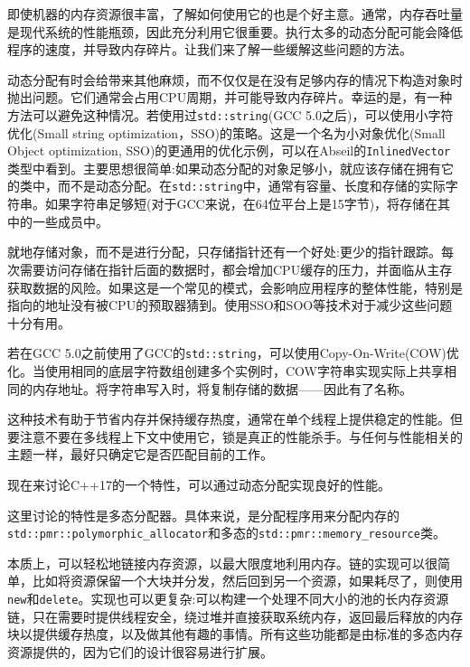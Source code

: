 

即使机器的内存资源很丰富，了解如何使用它的也是个好主意。通常，内存吞吐量是现代系统的性能瓶颈，因此充分利用它很重要。执行太多的动态分配可能会降低程序的速度，并导致内存碎片。让我们来了解一些缓解这些问题的方法。


动态分配有时会给带来其他麻烦，而不仅仅是在没有足够内存的情况下构造对象时抛出问题。它们通常会占用CPU周期，并可能导致内存碎片。幸运的是，有一种方法可以避免这种情况。若使用过\texttt{std::string}(GCC 5.0之后)，可以使用小字符优化(Small string optimization，SSO)的策略。这是一个名为小对象优化(Small Object optimization, SSO)的更通用的优化示例，可以在Abseil的\texttt{InlinedVector}类型中看到。主要思想很简单:如果动态分配的对象足够小，就应该存储在拥有它的类中，而不是动态分配。在\texttt{std::string}中，通常有容量、长度和存储的实际字符串。如果字符串足够短(对于GCC来说，在64位平台上是15字节)，将存储在其中的一些成员中。

就地存储对象，而不是进行分配，只存储指针还有一个好处:更少的指针跟踪。每次需要访问存储在指针后面的数据时，都会增加CPU缓存的压力，并面临从主存获取数据的风险。如果这是一个常见的模式，会影响应用程序的整体性能，特别是指向的地址没有被CPU的预取器猜到。使用SSO和SOO等技术对于减少这些问题十分有用。


若在GCC 5.0之前使用了GCC的\texttt{std::string}，可以使用Copy-On-Write(COW)优化。当使用相同的底层字符数组创建多个实例时，COW字符串实现实际上共享相同的内存地址。将字符串写入时，将复制存储的数据——因此有了名称。

这种技术有助于节省内存并保持缓存热度，通常在单个线程上提供稳定的性能。但要注意不要在多线程上下文中使用它，锁是真正的性能杀手。与任何与性能相关的主题一样，最好只确定它是否匹配目前的工作。

现在来讨论C++17的一个特性，可以通过动态分配实现良好的性能。


这里讨论的特性是多态分配器。具体来说，是分配程序用来分配内存的\texttt{std::pmr::polymorphic\_allocator}和多态的\texttt{std::pmr::memory\_resource}类。

本质上，可以轻松地链接内存资源，以最大限度地利用内存。链的实现可以很简单，比如将资源保留一个大块并分发，然后回到另一个资源，如果耗尽了，则使用\texttt{new}和\texttt{delete}。实现也可以更复杂:可以构建一个处理不同大小的池的长内存资源链，只在需要时提供线程安全，绕过堆并直接获取系统内存，返回最后释放的内存块以提供缓存热度，以及做其他有趣的事情。所有这些功能都是由标准的多态内存资源提供的，因为它们的设计很容易进行扩展。

